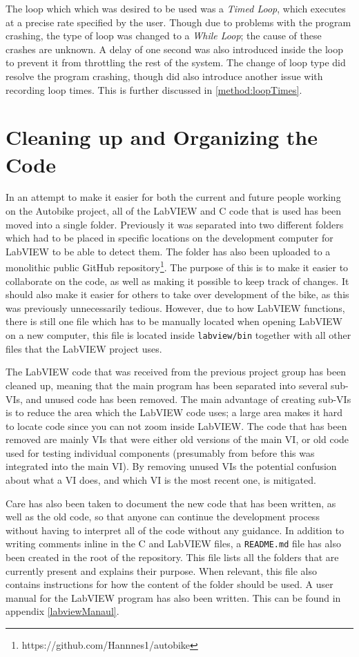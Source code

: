 The loop which which was desired to be used was a \textit{Timed Loop}, which executes at a precise rate specified by the user. Though due to problems with the program crashing, the type of loop was changed to a \textit{While Loop}; the cause of these crashes are unknown. A delay of one second was also introduced inside the loop to prevent it from throttling the rest of the system. The change of loop type did resolve the program crashing, though did also introduce another issue with recording loop times. This is further discussed in \ref{method:loopTimes}.

\section{Cleaning up and Organizing the Code}

In an attempt to make it easier for both the current and future people working on the Autobike project, all of the LabVIEW and C code that is used has been moved into a single folder. Previously it was separated into two different folders which had to be placed in specific locations on the development computer for LabVIEW to be able to detect them. The folder has also been uploaded to a monolithic public GitHub repository\footnote{https://github.com/Hannnes1/autobike}. The purpose of this is to make it easier to collaborate on the code, as well as making it possible to keep track of changes. It should also make it easier for others to take over development of the bike, as this was previously unnecessarily tedious. However, due to how LabVIEW functions, there is still one file which has to be manually located when opening LabVIEW on a new computer, this file is located inside \texttt{labview/bin} together with all other files that the LabVIEW project uses.

The LabVIEW code that was received from the previous project group has been cleaned up, meaning that the main program has been separated into several sub-VIs, and unused code has been removed. The main advantage of creating sub-VIs is to reduce the area which the LabVIEW code uses; a large area makes it hard to locate code since you can not zoom inside LabVIEW. The code that has been removed are mainly VIs that were either old versions of the main VI, or old code used for testing individual components (presumably from before this was integrated into the main VI). By removing unused VIs the potential confusion about what a VI does, and which VI is the most recent one, is mitigated.

Care has also been taken to document the new code that has been written, as well as the old code, so that anyone can continue the development process without having to interpret all of the code without any guidance. In addition to writing comments inline in the C and LabVIEW files, a \texttt{README.md} file has also been created in the root of the repository. This file lists all the folders that are currently present and explains their purpose. When relevant, this file also contains instructions for how the content of the folder should be used. A user manual for the LabVIEW program has also been written. This can be found in appendix \ref{labviewManaul}.

